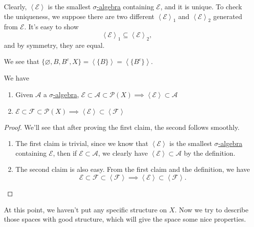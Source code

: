 \begin{remark}
	Clearly, \(\left<\mathcal{E} \right>\) is the smallest \hyperref[def:sigma-algebra]{\(\sigma\)-algebra} containing \(\mathcal{E}\), and it is unique.
	To check the uniqueness, we suppose there are two different \(\left<\mathcal{E}\right>_1\) and \(\left<\mathcal{E}\right>_2\)
	generated from \(\mathcal{E} \). It's easy to show
	\[
		\left<\mathcal{E}\right>_1\subseteq \left<\mathcal{E}\right>_2,
	\]
	and by symmetry, they are equal.
\end{remark}
\begin{eg}
	We see that \(\{\varnothing , B, B^{c} , X\}= \left<\{B\}\right> = \left<\{B^{c} \}\right>\).
\end{eg}

\begin{lemma}\label{lma:lec2-1}
	We have
	\begin{enumerate}
		\item Given \(\mathcal{A}\) a \hyperref[def:sigma-algebra]{\(\sigma\)-algebra}, \(\mathcal{E} \subset \mathcal{A} \subset \mathcal{P} (X)\implies \left<\mathcal{E}\right> \subset \mathcal{A} \)
		\item \(\mathcal{E} \subset \mathcal{F} \subset \mathcal{P} (X)\implies \left<\mathcal{E}\right> \subset\left<\mathcal{F} \right>\)
	\end{enumerate}
\end{lemma}
\begin{proof}
	We'll see that after proving the first claim, the second follows smoothly.
	\begin{enumerate}
		\item The first claim is trivial, since we know that \(\left<\mathcal{E} \right>\) is the smallest \hyperref[def:sigma-algebra]{\(\sigma\)-algebra} containing \(\mathcal{E} \),
		      then if \(\mathcal{E} \subset \mathcal{A} \), we clearly have \(\left<\mathcal{E} \right>\subset \mathcal{A} \) by the definition.
		\item The second claim is also easy. From the first claim and the definition, we have
		      \[
			      \mathcal{E} \subset \mathcal{F} \subset \left< \mathcal{F} \right> \implies \left< \mathcal{E} \right>\subset \left< \mathcal{F} \right>.
		      \]
	\end{enumerate}
\end{proof}

At this point, we haven't put any specific structure on \(X\). Now we try to describe those spaces with good structure, which will give the space some nice properties.

